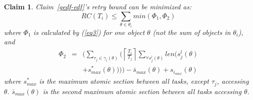 \documentclass{sig-alternate}
\newtheorem{clm}{Claim}
\begin{document}
\begin{clm}
Claim~\ref{gedf-edf}'s retry bound can be minimized as:
\begin{equation}
RC(T_{i})\le \sum_{\theta\in\theta_{i}}min(\Phi_1 , \Phi_2)\label{eq5}\end{equation}
where $\Phi_1$ is calculated by (\ref{eq3}) for one object $\theta$ (not the sum of objects in $\theta_i$),  and 
\begin{eqnarray}
\Phi_2 & = & \Bigg(\sum_{\tau_{j}\in\gamma_i(\theta)} \Big(\left\lceil\frac{T_{i}}{T_{j}}\right\rceil\sum_{\forall s_{j}^{l}(\theta)}len \big(s_{j}^{l}(\theta)\nonumber \\
 &  & +s_{max}^{*}(\theta) \big) \Big) \Bigg)-\bar{s}_{max}(\theta)+s_{i_{max}}(\theta)\label{eq4}\end{eqnarray}
 where $s^*_{max}$ is the maximum atomic section between all tasks, except $\tau_j$, accessing $\theta$. $\bar{s}_{max}(\theta)$ is the second maximum atomic section between all tasks accessing $\theta$.
\end{clm}
\end{document}
